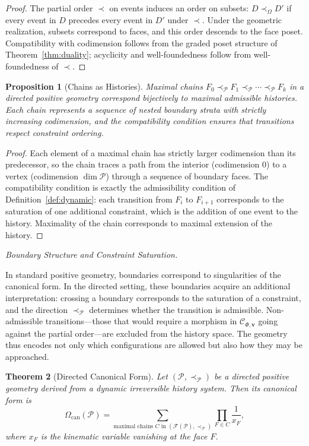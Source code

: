 \documentclass[11pt]{article}
\theoremstyle{plain}
\newtheorem{theorem}{Theorem}[section]
\newtheorem{proposition}[theorem]{Proposition}
\theoremstyle{definition}
\theoremstyle{remark}
\newcommand{\OmKS}{\Omega}
\newcommand{\CF}{\Omega_{\mathrm{can}}}
\newcommand{\Ccat}{\mathcal{C}_{\Phi,\mathbf{v}}}
\begin{document}
\begin{proof}
The partial order $\prec$ on events induces an order on subsets: $D \prec_{\OmKS} D'$ if every event in $D$ precedes every event in $D'$ under $\prec$. Under the geometric realization, subsets correspond to faces, and this order descends to the face poset. Compatibility with codimension follows from the graded poset structure of Theorem~\ref{thm:duality}; acyclicity and well-foundedness follow from well-foundedness of $\prec$.
\end{proof}

\begin{proposition}[Chains as Histories]
Maximal chains $F_0 \prec_{\mathcal{P}} F_1 \prec_{\mathcal{P}} \cdots \prec_{\mathcal{P}} F_k$ in a directed positive geometry correspond bijectively to maximal admissible histories. Each chain represents a sequence of nested boundary strata with strictly increasing codimension, and the compatibility condition ensures that transitions respect constraint ordering.
\end{proposition}

\begin{proof}
Each element of a maximal chain has strictly larger codimension than its predecessor, so the chain traces a path from the interior (codimension 0) to a vertex (codimension $\dim\mathcal{P}$) through a sequence of boundary faces. The compatibility condition is exactly the admissibility condition of Definition~\ref{def:dynamic}: each transition from $F_i$ to $F_{i+1}$ corresponds to the saturation of one additional constraint, which is the addition of one event to the history. Maximality of the chain corresponds to maximal extension of the history.
\end{proof}

\medskip\noindent\textit{Boundary Structure and Constraint Saturation.}

In standard positive geometry, boundaries correspond to singularities of the canonical form. In the directed setting, these boundaries acquire an additional interpretation: crossing a boundary corresponds to the saturation of a constraint, and the direction $\prec_{\mathcal{P}}$ determines whether the transition is admissible. Non-admissible transitions---those that would require a morphism in $\Ccat$ going against the partial order---are excluded from the history space. The geometry thus encodes not only which configurations are allowed but also how they may be approached.

\begin{theorem}[Directed Canonical Form]
\label{thm:directed-form}
Let $(\mathcal{P}, \prec_{\mathcal{P}})$ be a directed positive geometry derived from a dynamic irreversible history system. Then its canonical form is
\[
  \CF(\mathcal{P}) = \sum_{\text{maximal chains } C \text{ in } (\mathcal{F}(\mathcal{P}), \prec_{\mathcal{P}})} \prod_{F \in C} \frac{1}{x_F},
\]
where $x_F$ is the kinematic variable vanishing at the face $F$.
\end{theorem}
\end{document}

